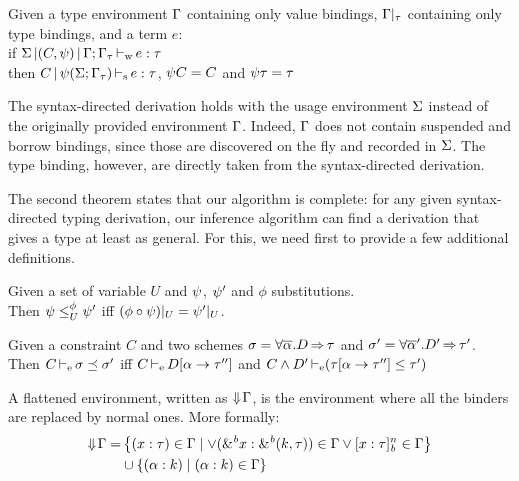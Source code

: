 \begin{theorem}
  Given a type environment $\E$ containing only value bindings,
  $\E|_\tau$ containing only type bindings, and a term $e$:\\
  if $\inferW{\Sv}{(C,\unif)}{\E;\E_\tau}{e}{\tau}$\\
  then $\inferS{C}{\unif(\Sv;\E_\tau)}{e}{\tau}$, $\unif C = C$ and $\unif \tau = \tau$
\end{theorem}

The syntax-directed derivation holds with the usage environment $\Sv$ instead of the originally provided environment $\E$. Indeed,
$\E$ does not contain suspended and borrow bindings, since those
are discovered on the fly and recorded in $\Sv$. The type binding, however,
are directly taken from the syntax-directed derivation.

The second theorem states that our algorithm is complete: for any given
syntax-directed typing derivation, our inference algorithm can find
a derivation that gives a type at least as general.
For this, we need first to provide a few additional definitions.

\begin{definition}
  Given a set of variable $U$ and $\unif$, $\unif'$ and $\phi$
  substitutions. \\
  Then
  $\unif \leq^{\phi}_{U} \unif'$ iff $(\phi \circ \unif)|_{U} = \unif'|_U$.
\end{definition}

\begin{definition}
  Given a constraint $C$ and two schemes
  $\schm = \forall \Multi\tvar. \qual{D}{\tau}$ and
  $\schm' = \forall \Multi\tvar'. \qual{D'}{\tau'} $.
  Then $\entail{C}{\schm \preceq \schm'}$
  iff $\entail{C}{\subst{\tvar}{\tau''} D}$
  and $\entail{C\Cand D'}{\Cleq{\subst{\tvar}{\tau''}\tau}{\tau'}}$
\end{definition}

\begin{definition}
A flattened environment,
written as $\Eflat\E$, is the environment
where all the binders are replaced by normal ones. More formally:
\begin{align*}
  \Eflat\E
  =& \left\{\bvar{x}{\tau}\in\E \mid
    \vee \bvar{\borrow{x}}{\borrowty{k}{\tau}}\in\E
    \vee \svar{x}{\tau}^n\in\E
    \right\}\\
  &\cup \left\{ \bvar{\tvar}{k} \mid \bvar{\tvar}{k}\in\E \right\}
\end{align*}
\end{definition}


